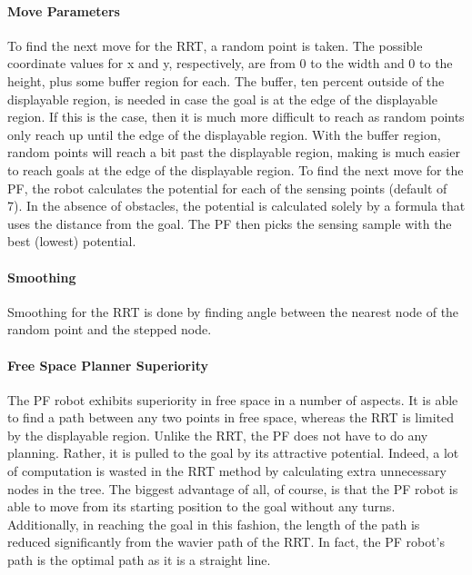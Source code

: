 \documentclass[12pt]{article}
\begin{document}
\paragraph*{Move Parameters}
To find the next move for the RRT, a random point is taken. The possible coordinate values for x and y, respectively, are from 0 to the width and 0 to the height, plus some buffer region for each. The buffer, ten percent outside of the displayable region, is needed in case the goal is at the edge of the displayable region. If this is the case, then it is much more difficult to reach as random points only reach up until the edge of the displayable region. With the buffer region, random points will reach a bit past the displayable region, making is much easier to reach goals at the edge of the displayable region.
To find the next move for the PF, the robot calculates the potential for each of the sensing points (default of 7). In the absence of obstacles, the potential is calculated solely by a formula that uses the distance from the goal. The PF then picks the sensing sample with the best (lowest) potential.
\paragraph*{Smoothing}
Smoothing for the RRT is done by finding angle between the nearest node of the random point and the stepped node. 
\paragraph*{Free Space Planner Superiority}
The PF robot exhibits superiority in free space in a number of aspects. It is able to find a path between any two points in free space, whereas the RRT is limited by the displayable region. Unlike the RRT, the PF does not have to do any planning. Rather, it is pulled to the goal by its attractive potential. Indeed, a lot of computation is wasted in the RRT method by calculating extra unnecessary nodes in the tree. The biggest advantage of all, of course, is that the PF robot is able to move from its starting position to the goal without any turns. Additionally, in reaching the goal in this fashion, the length of the path is reduced significantly from the wavier path of the RRT. In fact, the PF robot's path is the optimal path as it is a straight line.
\end{document}
